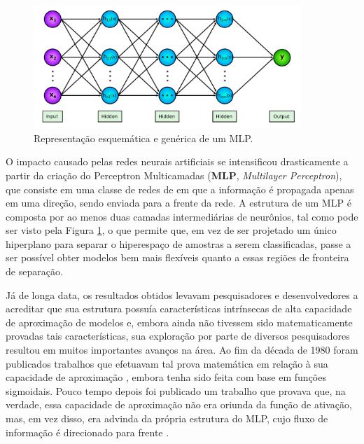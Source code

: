 \begin{figure}[H]
    \centering
    \includegraphics[width=0.9\textwidth]{figs/ann_mlp.pdf}
    \caption{Representação esquemática e genérica de um MLP.}
    \label{fig:ann_mlp}
\end{figure}

O impacto causado pelas redes neurais artificiais se intensificou drasticamente a partir da criação do Perceptron Multicamadas (\textbf{MLP}, \textit{Multilayer Perceptron}), que consiste em uma classe de redes de em que a informação é propagada apenas em uma direção, sendo enviada para a frente da rede. A estrutura de um MLP é composta por ao menos duas camadas intermediárias de neurônios, tal como pode ser visto pela Figura \ref{fig:ann_mlp}, o que permite que, em vez de ser projetado um único hiperplano para separar o hiperespaço de amostras a serem classificadas, passe a ser possível obter modelos bem mais flexíveis quanto a essas regiões de fronteira de separação.


Já de longa data, os resultados obtidos levavam pesquisadores e desenvolvedores a acreditar que sua estrutura possuía características intrínsecas de alta capacidade de aproximação de modelos e, embora ainda não tivessem sido matematicamente provadas tais características, sua exploração por parte de diversos pesquisadores resultou em muitos importantes avanços na área. Ao fim da década de 1980 foram publicados trabalhos que efetuavam tal prova matemática em relação à sua capacidade de aproximação \citep{cybenko1989approximation, hornik1989multilayer}, embora tenha sido feita com base em funções sigmoidais. Pouco tempo depois foi publicado um trabalho que provava que, na verdade, essa capacidade de aproximação não era oriunda da função de ativação, mas, em vez disso, era advinda da própria estrutura do MLP, cujo fluxo de informação é direcionado para frente \citep{HORNIK1991251}.

